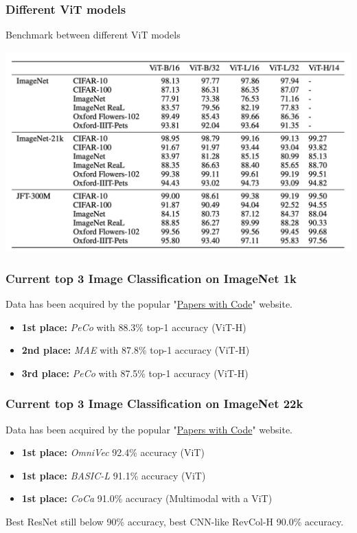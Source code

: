 
\begin{frame}
\frametitle{Different ViT models}
Benchmark between different ViT models
\begin{center}
    \includegraphics[width=1\textwidth]{img/4-section/More-benchmark_2.png}
\end{center}

\end{frame}


\begin{frame}
\frametitle{Current top 3 Image Classification on ImageNet 1k}
Data has been acquired by the popular "\href{https://paperswithcode.com/sota/image-classification-on-imagenet?tag_filter=171}{Papers with Code}" website.


\begin{itemize}
    \item \textbf{1st place:} \textit{PeCo} with 88.3\% top-1 accuracy (ViT-H)
    \item \textbf{2nd place:} \textit{MAE} with 87.8\% top-1 accuracy (ViT-H)
    \item \textbf{3rd place:} \textit{PeCo} with 87.5\% top-1 accuracy (ViT-H)
\end{itemize}

\end{frame}

\begin{frame}
\frametitle{Current top 3 Image Classification on ImageNet 22k}
Data has been acquired by the popular "\href{https://paperswithcode.com/sota/image-classification-on-imagenet}{Papers with Code}" website.


\begin{itemize}
    \item \textbf{1st place:} \textit{OmniVec} 92.4\% accuracy (ViT)
    \item \textbf{1st place:} \textit{BASIC-L} 91.1\% accuracy (ViT)
    \item \textbf{1st place:} \textit{CoCa} 91.0\% accuracy (Multimodal with a ViT)
\end{itemize}

Best ResNet still below 90\% accuracy, best CNN-like RevCol-H 90.0\% accuracy.

\end{frame}

